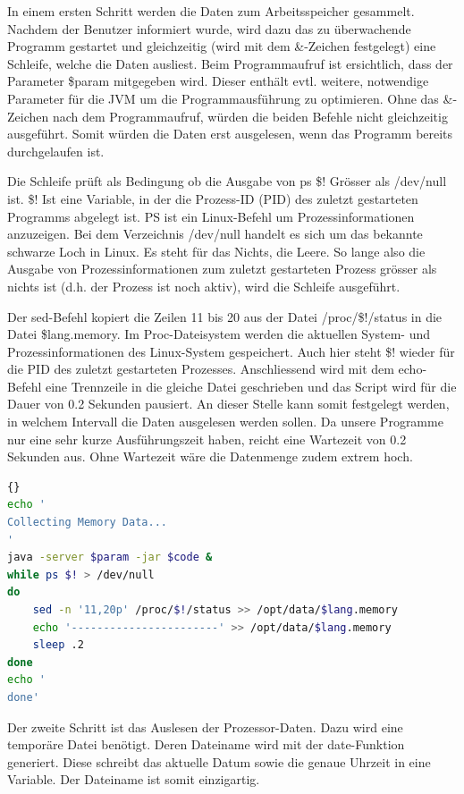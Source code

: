 \documentclass{fancydocument}
\begin{document}
In einem ersten Schritt werden die Daten zum Arbeitsspeicher gesammelt. Nachdem der Benutzer informiert wurde, wird dazu das zu überwachende Programm gestartet und gleichzeitig (wird mit dem \&-Zeichen festgelegt) eine Schleife, welche die Daten ausliest. Beim Programmaufruf ist ersichtlich, dass der Parameter \$param mitgegeben wird. Dieser enthält evtl. weitere, notwendige Parameter für die JVM um die Programmausführung zu optimieren. Ohne das \&-Zeichen nach dem Programmaufruf, würden die beiden Befehle nicht gleichzeitig ausgeführt. Somit würden die Daten erst ausgelesen, wenn das Programm bereits durchgelaufen ist. 

Die Schleife prüft als Bedingung ob die Ausgabe von ps \$! Grösser als /dev/null ist. \$! Ist eine Variable, in der die Prozess-ID (PID) des zuletzt gestarteten Programms abgelegt ist. PS ist ein Linux-Befehl um Prozessinformationen anzuzeigen. Bei dem Verzeichnis /dev/null handelt es sich um das bekannte schwarze Loch in Linux. Es steht für das Nichts, die Leere. So lange also die Ausgabe von Prozessinformationen zum zuletzt gestarteten Prozess grösser als nichts ist (d.h. der Prozess ist noch aktiv), wird die Schleife ausgeführt.

Der sed-Befehl kopiert die Zeilen 11 bis 20 aus der Datei /proc/\$!/status in die Datei \$lang.memory. Im Proc-Dateisystem werden die aktuellen System- und Prozessinformationen des Linux-System gespeichert. Auch hier steht \$! wieder für die PID des zuletzt gestarteten Prozesses. Anschliessend wird mit dem echo-Befehl eine Trennzeile in die gleiche Datei geschrieben und das Script wird für die Dauer von 0.2 Sekunden pausiert. An dieser Stelle kann somit festgelegt werden, in welchem Intervall die Daten ausgelesen werden sollen. Da unsere Programme nur eine sehr kurze Ausführungszeit haben, reicht eine Wartezeit von 0.2 Sekunden aus. Ohne Wartezeit wäre die Datenmenge zudem extrem hoch.

\begin{minipage}{\textwidth}
\begin{lstlisting}[language=bash,caption=Speicherdaten sammeln]{}
echo '
Collecting Memory Data...
'
java -server $param -jar $code &
while ps $! > /dev/null
do
	sed -n '11,20p' /proc/$!/status >> /opt/data/$lang.memory
	echo '-----------------------' >> /opt/data/$lang.memory		
	sleep .2
done
echo '
done'
\end{lstlisting}
\end{minipage}

Der zweite Schritt ist das Auslesen der Prozessor-Daten. Dazu wird eine temporäre Datei benötigt. Deren Dateiname wird mit der date-Funktion generiert. Diese schreibt das aktuelle Datum sowie die genaue Uhrzeit in eine Variable. Der Dateiname ist somit einzigartig.
\end{document}
